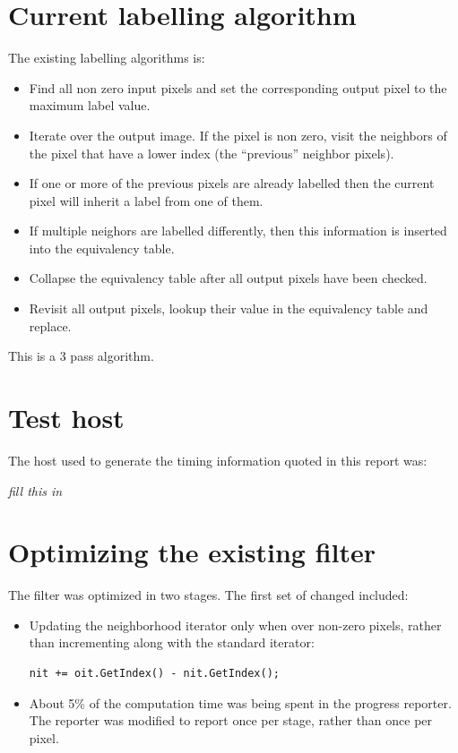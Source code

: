 \documentclass[IJ]{cesj}
\begin{document}
\section{Current labelling algorithm}
The existing labelling algorithms is:
\begin{itemize}
\item Find all non zero input pixels and set the corresponding output 
pixel to the maximum label value.
\item Iterate over the output image. If the pixel is non zero, visit 
the neighbors of the pixel that have a lower index (the ``previous''
neighbor pixels).
\item If one or more of the previous pixels are already labelled 
then the current pixel will inherit a label from one of them.
\item If multiple neighors are labelled differently, then this 
information is inserted into the equivalency table.
\item Collapse the equivalency table after all output pixels have 
been checked.
\item Revisit all output pixels, lookup their value in the equivalency table and replace.
\end{itemize}

This is a 3 pass algorithm.

\section{Test host}
The host used to generate the timing information quoted in this report was:

{\em fill this in}

\section{Optimizing the existing filter}
The filter was optimized in two stages. The first set of changed included:
\begin{itemize}
\item Updating the neighborhood iterator only when over non-zero pixels,
      rather than incrementing along with the standard iterator:
\begin{lstlisting}
nit += oit.GetIndex() - nit.GetIndex(); 
\end{lstlisting}

\item About 5\% of the computation time was being spent in the progress reporter. The reporter was modified to report once per stage, rather than once per pixel.
\end{itemize}
\end{document}
